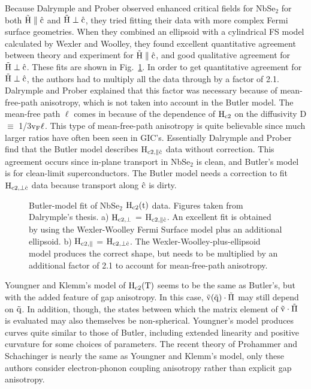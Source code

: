         Because Dalrymple and Prober observed  enhanced critical fields for
NbSe$_2$ for both $\rm  \vec{H}  \parallel \hat{c}$  and $\rm
\vec{H}  \perp \hat{c}$,\cite{dalrymple84}  they tried fitting  their  data
with  more complex   Fermi   surface  geometries.  When   they  combined an
ellipsoid     with  a cylindrical   FS    model calculated   by Wexler  and
Woolley\cite{wexler76}, they found excellent quantitative agreement between
theory and  experiment  for    $\rm \vec{H} \parallel  \hat{c}$,   and good
qualitative agreement  for $\rm  \vec{H} \perp  \hat{c}$.\cite{dalrymple83}
These fits are shown in  Fig.~\ref{nbse2fit}.  In order to get quantitative
agreement for $\rm \vec{H} \perp \hat{c}$, the authors had to  multiply all
the data through by a factor of  2.1.  Dalrymple  and Prober explained that
this factor was necessary  because  of mean-free-path anisotropy, which  is
not taken into  account in the Butler   model.   The mean-free  path $\ell$
comes  in  because of  the dependence of  $\rm H_{c2}$ on the diffusivity D
$\equiv$   1/3$\rm v_F \ell$.    This type of  mean-free-path anisotropy is
quite believable  since    much larger ratios   have often    been seen  in
GIC's.\cite{mcrae88} Essentially Dalrymple  and Prober find that the Butler
model describes $\rm  H_{c2,  \parallel \hat{c}}$ data without  correction.
This agreement occurs  since in-plane transport  in  NbSe$_2$ is clean, and
Butler's model is for clean-limit superconductors.  The  Butler model needs
a correction to fit $\rm H_{c2, \perp
\hat{c}}$ data because transport along $\rm \hat{c}$ is dirty.

\begin{figure}
\vspace{16cm}
\caption[Butler-model fit of NbSe$_2$ $\rm H_{c2}(t)$
data.]{Butler-model\cite{butler80} fit of NbSe$_2$ $\rm H_{c2}(t)$ data.
Figures taken from Dalrymple's thesis.\cite{dalrymple83} a) $\rm H_{c2,
\perp}$ = $\rm H_{c2, \parallel \hat{c}}$.  An excellent fit is obtained by
using the Wexler-Woolley Fermi Surface model\cite{wexler76} plus an additional ellipsoid.
b) $\rm H_{c2, \parallel}$ = $\rm H_{c2, \perp \hat{c}}$. The
Wexler-Woolley-plus-ellipsoid model produces the correct shape, but needs
to be multiplied by an additional factor of 2.1 to account for mean-free-path
anisotropy.}
\label{nbse2fit}
\end{figure}

        Youngner and Klemm's model of $\rm H_{c2}(T)$ seems to be  the same
as Butler's, but with the added feature of gap anisotropy.\cite{youngner80}
In  this  case, $\rm \vec{v}(\vec{q}) \cdot  \vec{\Pi}$ may still depend on
$\rm  \vec{q}$.  In addition,  though, the  states between which the matrix
element  of $\rm \vec{v} \cdot \vec{\Pi}$  is evaluated may also themselves
be non-spherical.  Youngner's model  produces curves quite similar to those
of  Butler, including  extended linearity and  positive  curvature for some
choices   of   parameters.     The  recent    theory   of    Prohammer  and
Schachinger\cite{prohammer87} is nearly  the same as  Youngner and  Klemm's
model, only   these  authors  consider electron-phonon  coupling anisotropy
rather than explicit gap anisotropy.

